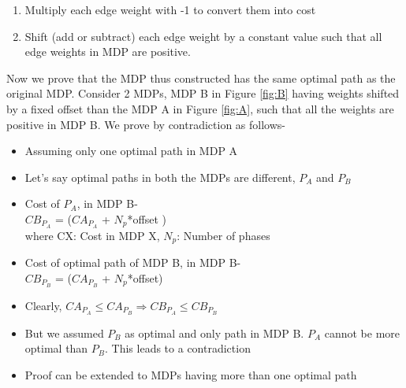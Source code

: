 \documentclass[a4paper,12pt]{article}
\begin{document}
\begin{enumerate}
\item Multiply each edge weight with -1 to convert them into cost
\item Shift (add or subtract) each edge weight by a constant value such that all edge weights in MDP are positive.
\end{enumerate}

Now we prove that the MDP thus constructed has the same optimal path as the original MDP. Consider 2 MDPs, MDP B in Figure \ref{fig:B} having weights shifted by a fixed offset than the MDP A in Figure \ref{fig:A}, such that all the weights are positive in MDP B. We prove by contradiction as follows-

\begin{itemize}
\item Assuming only one optimal path in MDP A
\item Let's say optimal paths in both the MDPs are different, $P_A$ and $P_B$
\item Cost of $P_A$, in MDP B-\\
\hspace*{1cm} $CB_{P_A}$ = ($CA_{P_A}$ + $N_p$*offset ) \\
\hspace*{3cm} where CX: Cost in MDP X, $N_p$: Number of phases
\item Cost of optimal path of MDP B, in MDP B-\\
\hspace*{1cm} $CB_{P_B}$ = ($CA_{P_B}$ + $N_p$*offset)
\item Clearly, $CA_{P_A} \leq CA_{P_B}  \Rightarrow  CB_{P_A} \leq CB_{P_B}$
\item But we assumed $P_B$ as optimal and only path in MDP B. $P_A$ cannot be more optimal than $P_B$. This leads to a contradiction
\item Proof can be extended to MDPs having more than one optimal path
\end{itemize}
\end{document}

